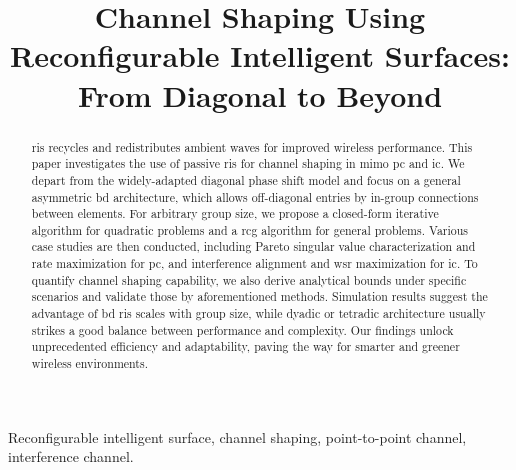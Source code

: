 \documentclass[journal]{IEEEtran}
\begin{document}
\title{Channel Shaping Using Reconfigurable Intelligent Surfaces: From Diagonal to Beyond}
\author{
}
\maketitle

\begin{abstract}
	\gls{ris} recycles and redistributes ambient waves for improved wireless performance.
	This paper investigates the use of passive \gls{ris} for channel shaping in \gls{mimo} \gls{pc} and \gls{ic}.
	We depart from the widely-adapted diagonal phase shift model and focus on a general asymmetric \gls{bd} architecture, which allows off-diagonal entries by in-group connections between elements.
	For arbitrary group size, we propose a closed-form iterative algorithm for quadratic problems and a \gls{rcg} algorithm for general problems.
	Various case studies are then conducted, including Pareto singular value characterization and rate maximization for \gls{pc}, and interference alignment and \gls{wsr} maximization for \gls{ic}.
	To quantify channel shaping capability, we also derive analytical bounds under specific scenarios and validate those by aforementioned methods.
	Simulation results suggest the advantage of \gls{bd} \gls{ris} scales with group size, while dyadic or tetradic architecture usually strikes a good balance between performance and complexity.
	Our findings unlock unprecedented efficiency and adaptability, paving the way for smarter and greener wireless environments.
\end{abstract}

\begin{IEEEkeywords}
	Reconfigurable intelligent surface, channel shaping, point-to-point channel, interference channel.
\end{IEEEkeywords}
\end{document}

